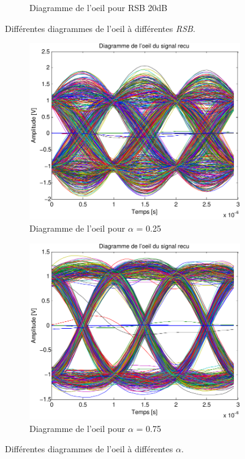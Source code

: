 \documentclass[a4paper,11pt]{article}
\begin{document}
\begin{figure}
\begin{subfigure}{.5\textwidth}
  		\caption{Diagramme de l'oeil pour RSB 20dB}
  		\label{fig:q10E20}
	\end{subfigure}
	\caption{Différentes diagrammes de l'oeil à différentes \emph{RSB}.}
	\label{fig:q10E}
\end{figure}

\begin{figure}
	\begin{subfigure}{.5\textwidth}
  		\centering
  		\includegraphics[width=1\linewidth]{Q10-alfa025-crop.pdf}
  		\caption{Diagramme de l'oeil pour $\alpha$ = 0.25}
  		\label{fig:q10a025}
	\end{subfigure}
	\begin{subfigure}{.5\textwidth}
  		\centering
  		\includegraphics[width=1\linewidth]{Q10-alfa075-crop.pdf}
  		\caption{Diagramme de l'oeil pour $\alpha$ = 0.75}
  		\label{fig:q10a075}
	\end{subfigure}
	\caption{Différentes diagrammes de l'oeil à différentes $\alpha$.}
	\label{fig:q10a}
\end{figure} 
\end{document}
